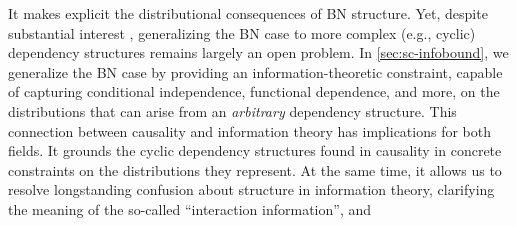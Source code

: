 It makes explicit the distributional consequences of BN structure.
Yet, despite
substantial interest \citep{Baier_2022},
generalizing the BN case to more
complex (e.g., cyclic) dependency structures remains largely an open
problem.  
In \cref{sec:sc-infobound}, we 
generalize the BN case by
providing an information-theoretic constraint,
capable of capturing conditional independence, functional dependence, and more,
on the distributions that can arise from an \emph{arbitrary} 
dependency structure.
This connection between causality and information theory has implications for both fields. It grounds the cyclic dependency structures found in causality in concrete constraints on the distributions they represent. 
At the same time, it allows us to resolve longstanding confusion about structure in information theory, clarifying the meaning of the so-called ``interaction information'', and
